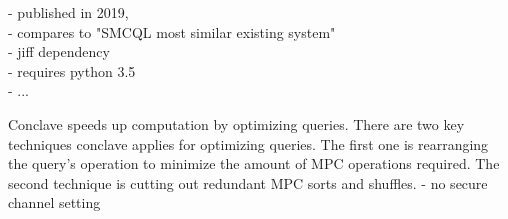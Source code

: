 - published in 2019,\\
- compares to "SMCQL most similar existing system"\\
- jiff dependency \\
- requires python 3.5 \\
- ...

Conclave speeds up computation by optimizing queries. There are two key techniques conclave applies for optimizing queries. The first one is rearranging the query's operation to minimize the amount of MPC operations required. The second technique is cutting out redundant MPC sorts and shuffles.  
- no secure channel setting\\